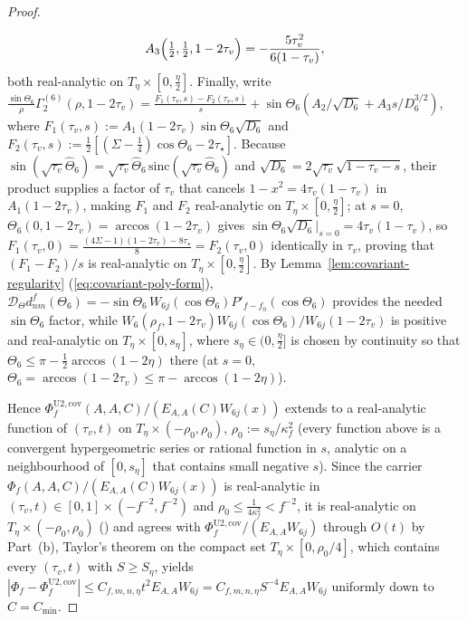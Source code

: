 \documentclass[11pt]{article}
\theoremstyle{definition}
\theoremstyle{remark}
\newcommand{\cD}{\mathcal{D}}
\renewcommand{\_}{\oldunderscore\penalty0\hskip0pt\relax}
\begin{document}
\begin{proof}
\begin{enumerate}[leftmargin=2em,itemsep=2pt]
\begin{equation}
\begin{gathered}
  A_3\Bigl(\tfrac12,\tfrac12,1-2\tau_v\Bigr) = -\frac{5\tau_v^2}{6(1-\tau_v)},
  \end{gathered}
\end{equation}
both real-analytic on $T_\eta\times[0,\frac\eta2]$. Finally, write
  $\frac{\sin\Theta_6}{\rho}\Gamma_2^{(6)}(\rho,1-2\tau_v)=\frac{F_1(\tau_v,s)-F_2(\tau_v,s)}{s}+\sin\Theta_6(A_2/\sqrt{D_6}+A_3
  s/D_6^{3/2})$, where $F_1(\tau_v,s):=A_1(1-2\tau_v)\sin\Theta_6\sqrt{D_6}$ and
  $F_2(\tau_v,s):=\frac12[(\Sigma-\frac14)\cos\Theta_6-2\tau_\star]$. Because
  $\sin(\sqrt{\tau_v}\widehat{\Theta}_6)=\sqrt{\tau_v}\widehat{\Theta}_6\,\mathrm{sinc}(\sqrt{\tau_v}\widehat{\Theta}_6)$ and
  $\sqrt{D_6}=2\sqrt{\tau_v}\sqrt{1-\tau_v-s}$, their product supplies a factor of $\tau_v$ that cancels
  $1-x^2=4\tau_v(1-\tau_v)$ in $A_1(1-2\tau_v)$, making $F_1$ and $F_2$ real-analytic on $T_\eta\times[0,\frac\eta2]$; at
  $s=0$, $\Theta_6(0,1-2\tau_v)=\arccos(1-2\tau_v)$ gives $\sin\Theta_6\sqrt{D_6}|_{s=0}=4\tau_v(1-\tau_v)$, so
  $F_1(\tau_v,0)=\frac{(4\Sigma-1)(1-2\tau_v)-8\tau_\star}{8}=F_2(\tau_v,0)$ identically in $\tau_v$, proving that $(F_1-F_2)/s$
  is real-analytic on $T_\eta\times[0,\frac\eta2]$. By Lemma~\ref{lem:covariant-regularity} (\eqref{eq:covariant-poly-form}),
  $\cD_\Theta d^f_{nm}(\Theta_6)=-\sin\Theta_6\,W_{6j}(\cos\Theta_6)P'_{f-f_0}(\cos\Theta_6)$ provides the needed $\sin\Theta_6$
  factor, while $W_6(\rho_f,1-2\tau_v)W_{6j}(\cos\Theta_6)/W_{6j}(1-2\tau_v)$ is positive and real-analytic on
  $T_\eta\times[0,s_\eta]$, where $s_\eta\in(0,\frac\eta2]$ is chosen by continuity so that $\Theta_6\le\pi-\frac12\arccos(1-2\eta)$ there
  (at $s=0$, $\Theta_6=\arccos(1-2\tau_v)\le\pi-\arccos(1-2\eta)$).
\end{enumerate}
Hence $\Phi_f^{\mathrm{U2,cov}}(A,A,C)/(E_{A,A}(C)W_{6j}(x))$ extends to a real-analytic function of $(\tau_v,t)$ on
  $T_\eta\times(-\rho_0,\rho_0)$, $\rho_0:=s_\eta/\kappa_f^2$ (every function above is a convergent hypergeometric series or rational
  function in $s$, analytic on a neighbourhood of $[0,s_\eta]$ that contains small negative $s$). Since the carrier
  $\Phi_f(A,A,C)/(E_{A,A}(C)W_{6j}(x))$ is real-analytic in $(\tau_v,t)\in[0,1]\times(-f^{-2},f^{-2})$ and $\rho_0\le\frac{1}{4\kappa_f^2}<f^{-2}$,
  it is real-analytic on $T_\eta\times(-\rho_0,\rho_0)$ (\cite[Theorem~10.1(b)]{LewisFixedRank}) and agrees with $\Phi_f^{\mathrm{U2,cov}}/(E_{A,A}W_{6j})$
  through $O(t)$ by Part~(b), Taylor's theorem on the compact set $T_\eta\times[0,\rho_0/4]$, which contains every $(\tau_v,t)$ with $S\ge S_\eta$, yields
  $|\Phi_f-\Phi_f^{\mathrm{U2,cov}}|\le C_{f,m,n,\eta}t^2 E_{A,A}W_{6j}=C_{f,m,n,\eta}S^{-4}E_{A,A}W_{6j}$ uniformly down to $C=C_{\min}$.
\end{proof}
\end{document}
